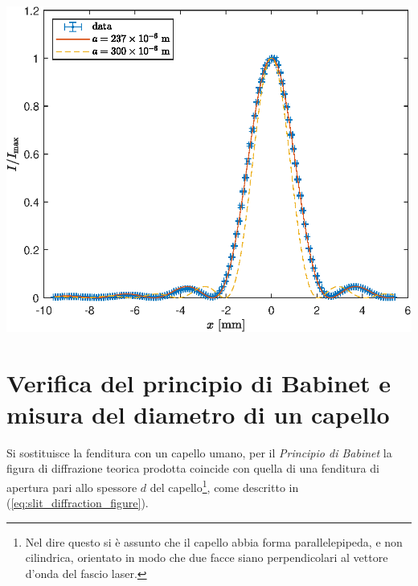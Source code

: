 \documentclass[10pt,oneside,a4paper]{article}
\newenvironment{Figure}
  {\par\medskip\noindent\minipage{\linewidth}}
  {\endminipage\par\medskip}
\begin{document}
\begin{multicols}{2}
\begin{Figure}
	\begin{center}
	\includegraphics[width=\linewidth]{figura_diffrazione.eps}
	\label{fig:I}
	\end{center}
\end{Figure}


\section{Verifica del principio di Babinet e misura del diametro di un capello}
Si sostituisce la fenditura con un capello umano, per il \emph{Principio di Babinet} la figura di diffrazione teorica prodotta coincide con quella di una fenditura di apertura pari allo spessore $d$ del capello\footnote{Nel dire questo si è assunto che il capello abbia forma parallelepipeda, e non cilindrica, orientato in modo che due facce siano perpendicolari al vettore d'onda del fascio laser.}, come descritto in (\ref{eq:slit_diffraction_figure}). 


\end{multicols}
\end{document}
